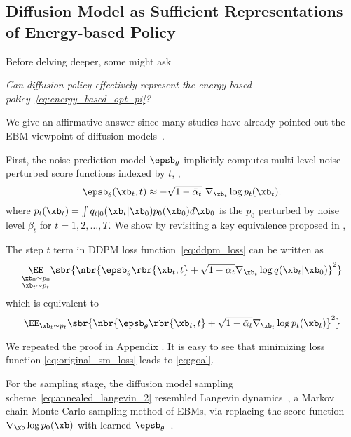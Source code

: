 \subsection{Diffusion Model as Sufficient Representations of Energy-based Policy}
Before delving deeper, some might ask

{
\centering
\textit{Can diffusion policy effectively represent the energy-based policy~\eqref{eq:energy_based_opt_pi}?}
}

We give an affirmative answer since many studies have already pointed out the EBM viewpoint of diffusion models~\cite{song2019generative,ho2020denoising,song2021scorebased}.  

First, the noise prediction model $\epsb_\theta$ implicitly computes multi-level noise perturbed score functions indexed by $t$, \ie,
\begin{equation}
    \epsb_\theta(\xb_t, t)\approx-\sqrt{1 - \bar\alpha_t}~\nabla_{\xb_t}\log p_t(\xb_t)\label{eq:goal}.
\end{equation}
where $p_t(\xb_t) = \int q_{t|0}(\xb_t|\xb_0)p_0(\xb_0)d\xb_0$
is the $p_0$ perturbed by noise level $\beta_t$ for $t=1,2,\dots, T$. 
We show by revisiting a key equivalence proposed in \citet{vincent2011connection},
\begin{proposition}
The step $t$ term in DDPM loss function~\eqref{eq:ddpm_loss} can be written as
\begin{equation}
    \underset{\substack{\xb_0\sim p_0\\\xb_t\sim p_t}}{\EE}\sbr{\nbr{\epsb_\theta\rbr{\xb_t, t} + \sqrt{1 -\bar\alpha_t}\nabla_{\xb_t}\log q(\xb_t|\xb_0)}^2}\label{eq:ddpm_loss_t_step}
\end{equation}
    which is equivalent to 
    \begin{equation}
    \EE_{\xb_t\sim p_t}\sbr{\nbr{\epsb_\theta\rbr{\xb_t, t} + \sqrt{1 -\bar\alpha_t} \nabla_{\xb_t}\log p_t(\xb_t)}^2}\label{eq:original_sm_loss}
    \end{equation}
\end{proposition}
We repeated the proof in Appendix . It is easy to see that minimizing loss function \eqref{eq:original_sm_loss} leads to \eqref{eq:goal}.

For the sampling stage, the diffusion model sampling scheme~\eqref{eq:annealed_langevin_2} resembled Langevin dynamics~\cite{parisi1981correlation}, a Markov chain Monte-Carlo sampling method of EBMs, 
via replacing the score function $\nabla_\xb\log p_0(\xb)$ with learned $\epsb_\theta$~\cite{ho2020denoising}. 


